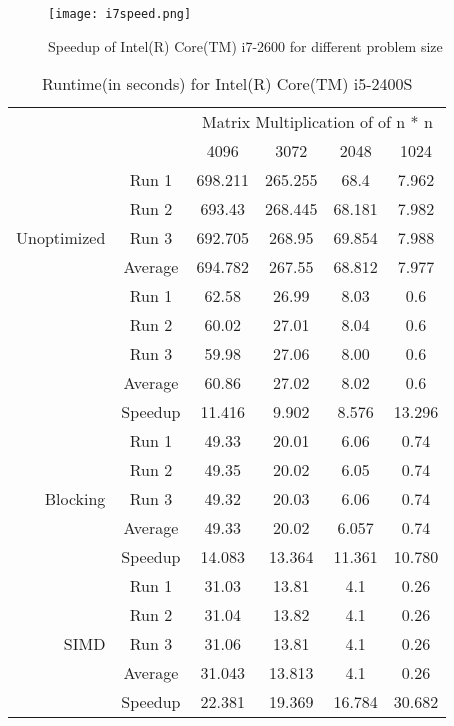 \documentclass{article}
\begin{document}
\begin{figure}[H]
\centering
\texttt{[image: i7speed.png]}
\caption{Speedup of Intel(R) Core(TM) i7-2600 for different problem size}
\label{pic:i7speed}
\end{figure}


\begin{table}[H]
\centering
\begin{tabular}{rc|c|c|c|c|}
\multicolumn{2}{r}{}
 &  \multicolumn{4}{c}{Matrix Multiplication of of n * n} \\
\cline{3-6}
& & 4096 & 3072 & 2048 & 1024 \\
\cline{1-6}
\multirow{5}{*}{Unoptimized} & \multicolumn{1}{|c|}{Run 1}  & 698.211 & 265.255 & 68.4 & 7.962 \\
\cline{2-6}
& \multicolumn{1}{|c|}{Run 2} & 693.43 & 268.445 & 68.181 & 7.982 \\
\cline{2-6}
& \multicolumn{1}{|c|}{Run 3}  & 692.705 & 268.95 & 69.854 & 7.988 \\
\cline{2-6}
& \multicolumn{1}{|c|}{Average}  & 694.782 & 267.55 & 68.812 & 7.977 \\
\cline{1-6}
\multirow{5}{*}{Reordered} & \multicolumn{1}{|c|}{Run 1}  & 62.58 & 26.99 & 8.03 & 0.6 \\
\cline{2-6}
& \multicolumn{1}{|c|}{Run 2} & 60.02 & 27.01 & 8.04 & 0.6 \\
\cline{2-6}
& \multicolumn{1}{|c|}{Run 3}  & 59.98 & 27.06 & 8.00 & 0.6 \\
\cline{2-6}
& \multicolumn{1}{|c|}{Average}  & 60.86 & 27.02 & 8.02 & 0.6 \\
\cline{2-6}
& \multicolumn{1}{|c|}{Speedup}  & 11.416 & 9.902 & 8.576 & 13.296 \\
\cline{1-6}
\multirow{5}{*}{Blocking} & \multicolumn{1}{|c|}{Run 1}  & 49.33 & 20.01 & 6.06 & 0.74\\
\cline{2-6}
& \multicolumn{1}{|c|}{Run 2} & 49.35 & 20.02 & 6.05 & 0.74\\
\cline{2-6}
& \multicolumn{1}{|c|}{Run 3}  & 49.32 & 20.03 & 6.06 & 0.74\\
\cline{2-6}
& \multicolumn{1}{|c|}{Average}  & 49.33 & 20.02 & 6.057 & 0.74\\
\cline{2-6}
& \multicolumn{1}{|c|}{Speedup}  & 14.083 & 13.364 & 11.361 & 10.780\\
\cline{1-6}
\multirow{5}{*}{SIMD} & \multicolumn{1}{|c|}{Run 1}  & 31.03 & 13.81 & 4.1 & 0.26 \\
\cline{2-6}
& \multicolumn{1}{|c|}{Run 2} & 31.04 & 13.82 & 4.1 & 0.26 \\
\cline{2-6}
& \multicolumn{1}{|c|}{Run 3}  & 31.06 & 13.81 & 4.1 & 0.26 \\
\cline{2-6}
& \multicolumn{1}{|c|}{Average}  & 31.043 & 13.813 & 4.1 & 0.26 \\
\cline{2-6}
& \multicolumn{1}{|c|}{Speedup}  & 22.381 & 19.369 & 16.784 & 30.682 \\
\cline{1-6}

\end{tabular}
 \caption{Runtime(in seconds) for Intel(R) Core(TM) i5-2400S}
 \label{tab:i5speed}
\end{table}
\end{document}
